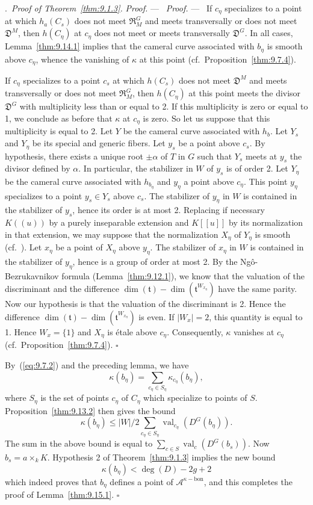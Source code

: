 \documentclass[12pt,a4paper,oneside,english,leqno]{smfart}
\makeatletter
\numberwithin{equation}{subsection}
\numberwithin{theo}{subsection}
\newenvironment{paragr}[1][]{\medskip\refstepcounter{subsection}%
  \par\noindent\hspace*{\parindent}\thesubsection.\ \emph{#1}%
  \@ifundefined{@empty}{}{}\ignorespaces}{\medskip}
\theoremstyle{plain}
\theoremstyle{definition}
\theoremstyle{remark}
\newenvironment{preuve}[1][]{\medskip\noindent\textit{Proof.} #1 ---\ }%
  {\hfill\ensuremath{\square}\medskip}
\DeclareMathOperator{\val}{val}
\newcommand{\Ac}{\mathcal{A}}
\newcommand{\tgo}{\mathfrak{t}}
\renewcommand{\leq}{\leqslant}
\makeatother
\begin{document}
\begin{paragr}[Proof of Theorem~\protect\ref{thm:9.1.3}.]
\begin{preuve}
\begin{preuve}
If $c_\eta$ specializes to a point at which $h_a(C_s)$ does not meet $\mathfrak{R}^G_M$ and meets transversally or does not meet $\mathfrak{D}^M$, then $h(C_\eta)$ at $c_\eta$ does not meet or meets transversally $\mathfrak{D}^G$. In all cases, Lemma~\ref{thm:9.14.1} implies that the cameral curve associated with $b_\eta$ is smooth above $c_\eta$, whence the vanishing of $\kappa$ at this point (cf.\ Proposition~\ref{thm:9.7.4}).

If $c_\eta$ specializes to a point $c_s$ at which $h(C_s)$ does not meet $\mathfrak{D}^M$ and meets transversally or does not meet $\mathfrak{R}^G_M$, then $h(C_\eta)$ at this point meets the divisor $\mathfrak{D}^G$ with multiplicity less than or equal to 2. If this multiplicity is zero or equal to 1, we conclude as before that $\kappa$ at $c_\eta$ is zero. So let us suppose that this multiplicity is equal to 2. Let $Y$ be the cameral curve associated with $h_b$. Let $Y_s$ and $Y_\eta$ be its special and generic fibers. Let $y_s$ be a point above $c_s$. By hypothesis, there exists a unique root $\pm\alpha$ of $T$ in $G$ such that $Y_s$ meets at $y_s$ the divisor defined by $\alpha$. In particular, the stabilizer in $W$ of $y_s$ is of order 2. Let $Y_\eta$ be the cameral curve associated with $h_{b_\eta}$ and $y_\eta$ a point above $c_\eta$. This point $y_\eta$ specializes to a point $y_s\in Y_s$ above $c_s$. The stabilizer of $y_\eta$ in $W$ is contained in the stabilizer of $y_s$, hence its order is at most 2. Replacing if necessary $K((u))$ by a purely inseparable extension and $K[[u]]$ by its normalization in that extension, we may suppose that the normalization $X_\eta$ of $Y_\eta$ is smooth (cf.\ \cite[Prop.~17.15.14]{EGAIV4}). Let $x_\eta$ be a point of $X_\eta$ above $y_\eta$. The stabilizer of $x_\eta$ in $W$ is contained in the stabilizer of $y_\eta$, hence is a group of order at most 2. By the Ng\^o-Bezrukavnikov formula (Lemma~\ref{thm:9.12.1}), we know that the valuation of the discriminant and the difference $\dim(\tgo)-\dim(\tgo^{W_{x_\eta}})$ have the same parity. Now our hypothesis is that the valuation of the discriminant is 2. Hence the difference $\dim(\tgo)-\dim(\tgo^{W_{x_\eta}})$ is even. If $|W_x|=2$, this quantity is equal to 1. Hence $W_x=\{1\}$ and $X_\eta$ is \'etale above $c_\eta$. Consequently, $\kappa$ vanishes at $c_\eta$ (cf.\ Proposition~\ref{thm:9.7.4}).
\end{preuve}

By~(\ref{eq:9.7.2}) and the preceding lemma, we have
$$\kappa(b_\eta)=\sum_{c_\eta\in S_\eta}\kappa_{c_\eta}(b_\eta),$$
where $S_\eta$ is the set of points $c_\eta$ of $C_\eta$ which specialize to points of $S$. Proposition~\ref{thm:9.13.2} then gives the bound
$$\kappa(b_\eta)\leq|W|/2\sum_{c_\eta\in S_\eta}\val_{c_\eta}(D^G(b_\eta)).$$
The sum in the above bound is equal to $\sum_{c\in S}\val_c(D^G(b_s))$. Now $b_s=a\times_kK$. Hypothesis 2 of Theorem~\ref{thm:9.1.3} implies the new bound
$$\kappa(b_\eta)<\deg(D)-2g+2$$
which indeed proves that $b_\eta$ defines a point of $\Ac^{\kappa-\mathrm{bon}}$, and this completes the proof of Lemma~\ref{thm:9.15.1}.
\end{preuve}


\end{paragr}
\end{document}

